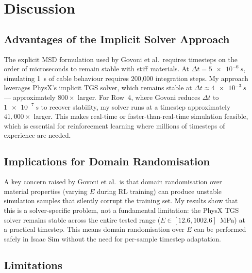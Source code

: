 \documentclass[11pt,a4paper]{article}
\begin{document}
\section{Discussion}

\subsection{Advantages of the Implicit Solver Approach}

The explicit MSD formulation used by Govoni et al.\ requires timesteps on the
order of microseconds to remain stable with stiff materials.  At
$\Delta t = \SI{5e-6}{s}$, simulating \SI{1}{s} of cable behaviour requires
200{,}000 integration steps.  My approach leverages PhysX's implicit TGS
solver, which remains stable at $\Delta t \approx \SI{4e-3}{s}$ ---
approximately $800\times$ larger.  For Row~4, where Govoni reduces
$\Delta t$ to $\SI{1e-7}{s}$ to recover stability, my solver runs at a
timestep approximately $41{,}000\times$ larger.  This makes real-time or
faster-than-real-time simulation feasible, which is essential for
reinforcement learning where millions of timesteps of experience are needed.

\subsection{Implications for Domain Randomisation}

A key concern raised by Govoni et al.\ is that domain randomisation over
material properties (varying $E$ during RL training) can produce unstable
simulation samples that silently corrupt the training set.  My results
show that this is a solver-specific problem, not a fundamental limitation:
the PhysX TGS solver remains stable across the entire tested range
($E \in [12.6, 1002.6]$~MPa) at a practical timestep.  This means
domain randomisation over $E$ can be performed safely in Isaac Sim
without the need for per-sample timestep adaptation.

\subsection{Limitations}
\end{document}
